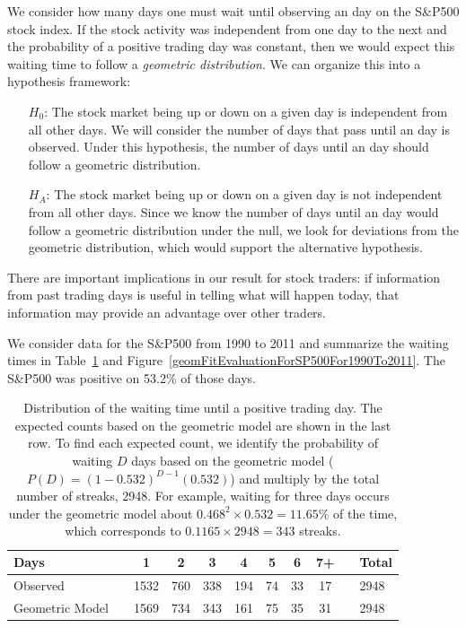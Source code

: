 We consider how many days one must wait until observing an  day on the S\&P500 stock index. If the stock activity was independent from one day to the next and the probability of a positive trading day was constant, then we would expect this waiting time to follow a \emph{geometric distribution}. We can organize this into a hypothesis framework:
\begin{itemize}
\item[$H_0$:] The stock market being up or down on a given day is independent from all other days. We will consider the number of days that pass until an  day is observed. Under this hypothesis, the number of days until an  day should follow a geometric distribution.
\item[$H_A$:] The stock market being up or down on a given day is not independent from all other days. Since we know the number of days until an  day would follow a geometric distribution under the null, we look for deviations from the geometric distribution, which would support the alternative hypothesis.
\end{itemize}
There are important implications in our result for stock traders: if information from past trading days is useful in telling what will happen today, that information may provide an advantage over other traders.

We consider data for the S\&P500 from 1990 to 2011 and summarize the waiting times in Table~\ref{sAndP500For1990To2011TimeToPosTrade2} and Figure~\ref{geomFitEvaluationForSP500For1990To2011}. The S\&P500 was positive on 53.2\% of those days.

\begin{table}
\centering
\begin{tabular}{ll ccc ccc c ll}
\hline
Days	 & \hspace{1mm} & 1 & 2 & 3 & 4 & 5 & 6 & 7+ & \hspace{1mm} & Total \\
\hline
Observed &		& 1532 & 760 & 338 & 194 & 74 & 33 & 17 & & 2948 \\
Geometric Model &		& 1569 & 734 & 343 & 161 & 75 & 35 & 31 & & 2948 \\
\hline
\end{tabular}
\caption{Distribution of the waiting time until a positive trading day. The expected counts based on the geometric model are shown in the last row. To find each expected count, we identify the probability of waiting $D$ days based on the geometric model ($P(D) = (1-0.532)^{D-1}(0.532)$) and multiply by the total number of streaks, 2948. For example, waiting for three days occurs under the geometric model about $0.468^2\times 0.532 = 11.65\%$ of the time, which corresponds to $0.1165\times 2948 = 343$ streaks.}
\label{sAndP500For1990To2011TimeToPosTrade2}
\end{table}


